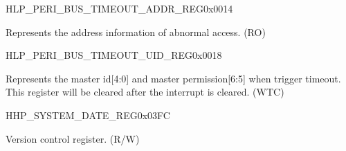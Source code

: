 \begin{register}{H}{LP\_PERI\_BUS\_TIMEOUT\_ADDR\_REG}{0x0014}\label{regdesc:LPPERIBUSTIMEOUTADDRREG}
%
\regnewline%
\begin{regdesc}\begin{reglist}
\label{fielddesc:LPPERIBUSTIMEOUTADDR}\item [LP\_PERI\_BUS\_TIMEOUT\_ADDR] Represents the address information of abnormal access. (RO)
\end{reglist}\end{regdesc}
\end{register}


\begin{register}{H}{LP\_PERI\_BUS\_TIMEOUT\_UID\_REG}{0x0018}\label{regdesc:LPPERIBUSTIMEOUTUIDREG}
%
%
\regnewline%
\begin{regdesc}\begin{reglist}
\label{fielddesc:LPPERIBUSTIMEOUTUID}\item [LP\_PERI\_BUS\_TIMEOUT\_UID] Represents the master id[4:0] and master permission[6:5] when trigger timeout. This register will be cleared after the interrupt is cleared. (WTC)
\end{reglist}\end{regdesc}
\end{register}


\begin{register}{H}{HP\_SYSTEM\_DATE\_REG}{0x03FC}\label{regdesc:HPSYSTEMDATEREG}
%
%
\regnewline%
\begin{regdesc}\begin{reglist}
\label{fielddesc:HPSYSTEMDATE}\item [HP\_SYSTEM\_DATE] Version control register. (R/W)
\end{reglist}\end{regdesc}
\end{register}
